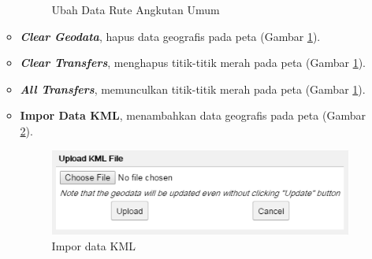 \begin{enumerate}
\begin{itemize}
\begin{figure}[htbp]
			\caption{Ubah Data Rute Angkutan Umum}
			\label{fig:3_tampilan_ubahrute}
		\end{figure}
		\item \textbf{\textit{Clear Geodata}}, hapus data geografis pada peta (Gambar \ref{fig:3_tampilan_ubahrute}).
		\item \textbf{\textit{Clear Transfers}}, menghapus titik-titik merah pada peta (Gambar \ref{fig:3_tampilan_ubahrute}).
		\item \textbf{\textit{All Transfers}}, memunculkan titik-titik merah pada peta (Gambar \ref{fig:3_tampilan_ubahrute}).
		\item \textbf{Impor Data KML}, menambahkan data geografis pada peta (Gambar \ref{fig:3_tampilan_imporkml}).
		\begin{figure}[htbp]
			\centering
				\includegraphics[scale=0.7]{Gambar/3_tampilan_imporkml.png}
			\caption{Impor data KML}
			\label{fig:3_tampilan_imporkml}
		\end{figure}
	\end{itemize}	


\end{enumerate}
